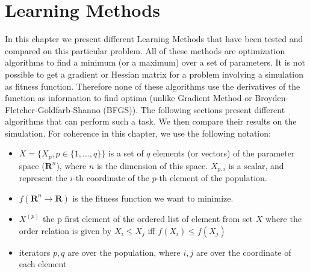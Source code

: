 
\chapter{Learning Methods} %

\label{Chapter 4} %


In this chapter we present different Learning Methods that have been tested and compared on this particular problem. All of these methods are optimization algorithms to find a minimum (or a maximum) over a set of parameters. It is not possible to get a gradient or Hessian matrix for a problem involving a simulation as fitness function. Therefore none of these algorithms use the derivatives of the function as information to find optima (unlike Gradient Method or Broyden-Fletcher-Goldfarb-Shanno (BFGS)). The following sections present different algorithms that can perform such a task. We then compare their results on the simulation. For coherence in this chapter, we use the following notation: 

\begin{itemize}
    \item $X = \{ X_p, p\in{\{1, ..., q\}}\} $ is a set of $q$ elements (or vectors) of the parameter space ($\mathbf{R}^ n $), where $n$ is the dimension of this space. $X_{p,i}$ is a scalar, and represent the $i$-th coordinate of the $p$-th element of the population.
    \item $f (\mathbf{R} ^ n \to \mathbf{R})$ is the fitness function we want to minimize.
    \item $X^{(p)}$ the p first element of the ordered list of element from set $X$ where the order relation is given by $X_i \leq X_j$ iff $f(X_i) \leq f(X_j)$
    \item iterators $p, q$ are over the population, where $i, j$ are over the coordinate of each element  
\end{itemize}

